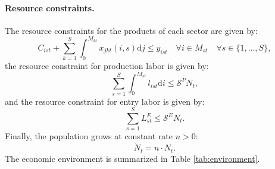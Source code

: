 \documentclass[12pt]{article}
\begin{document}
\paragraph{Resource constraints.} The resource constraints for the products of each sector are given by:
\begin{equation}
    C_{ist} + \sum_{k = 1}^S \int_0^{M_{kt}} x_{jkt}(i, s) \mathrm{d}j \leq y_{ist} \quad \forall i \in M_{st} \quad \forall s \in \{1, \ldots, S\}, \label{eq:product resource constraints}
\end{equation}
the resource constraint for production labor is given by:
\begin{equation}
    \sum_{s = 1}^S \int_0^{M_{st}} l_{ist} \mathrm{d}i \leq \mathcal{S}^P N_t, \label{eq:production labor resource constraint}
\end{equation}
and the resource constraint for entry labor is given by:
\begin{equation}
    \sum_{s = 1}^S L_{st}^E \leq \mathcal{S}^E N_t. \label{eq:entry labor resource constraint}
\end{equation}
Finally, the population grows at constant rate $n > 0$:
\begin{equation}
    \dot{N}_t = n \cdot N_t. \label{eq:population}
\end{equation}
The economic environment is summarized in Table \ref{tab:environment}.
\end{document}
